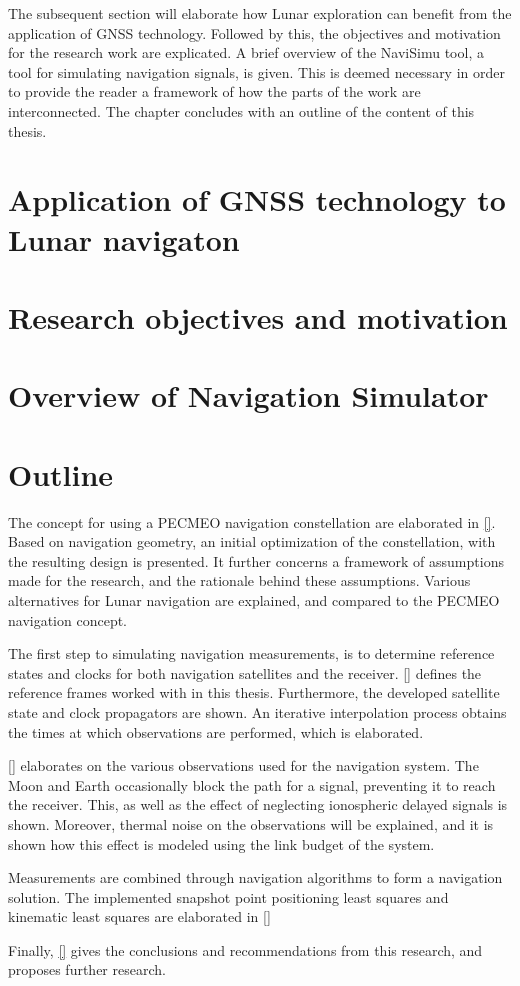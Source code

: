 The subsequent section will elaborate how Lunar exploration can benefit from the application of GNSS technology.
Followed by this, the objectives and motivation for the research work are explicated.
A brief overview of the NaviSimu tool, a tool for simulating navigation signals, is given. This is deemed necessary in order to provide the reader a framework of how the parts of the work are interconnected.
The chapter concludes with an outline of the content of this thesis.



\section{Application of GNSS technology to Lunar navigaton}


\section{Research objectives and motivation}


\section{Overview of Navigation Simulator}


\section{Outline}

The concept for using a PECMEO navigation constellation are elaborated in \autoref{}.
Based on navigation geometry, an initial optimization of the constellation, with the resulting design is presented. 
It further concerns a framework of assumptions made for the research, and the rationale behind these assumptions. 
Various alternatives for Lunar navigation are explained, and compared to the PECMEO navigation concept.

The first step to simulating navigation measurements, is to determine reference states and clocks for both navigation satellites and the receiver.
\autoref{} defines the reference frames worked with in this thesis. 
Furthermore, the developed satellite state and clock propagators are shown.
An iterative interpolation process obtains the times at which observations are performed, which is elaborated.

\autoref{} elaborates on the various observations used for the navigation system.
The Moon and Earth occasionally block the path for a signal, preventing it to reach the receiver.
This, as well as the effect of neglecting ionospheric delayed signals is shown.
Moreover, thermal noise on the observations will be explained, and it is shown how this effect is modeled using the link budget of the system.

Measurements are combined through navigation algorithms to form a navigation solution.
The implemented snapshot point positioning least squares and kinematic least squares are elaborated in \autoref{}

Finally, \autoref{} gives the conclusions and recommendations from this research, and proposes further research.